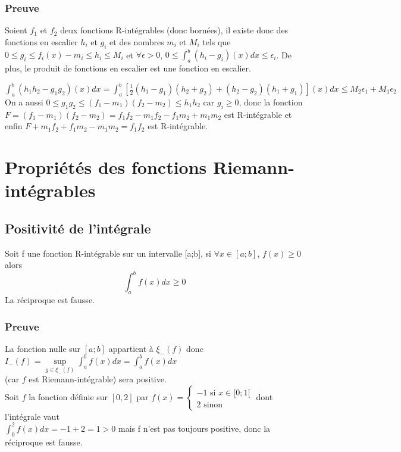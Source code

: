 \documentclass[a4paper,10pt]{book} %
\begin{document}
\subsubsection{Preuve}
Soient $f_1$ et $f_2$ deux fonctions R-intégrables (donc bornées), il existe donc des fonctions en escalier $h_i$ et $g_i$ et des nombres $m_i$ et $M_i$ tels que $0\leq g_i\leq f_i(x)-m_i\leq h_i\leq M_i$ et $\forall \epsilon>0$, $0\leq \displaystyle\int_a^b(h_i-g_i)(x)dx\leq \epsilon_i$. De plus, le produit de fonctions en escalier est une fonction en escalier.

$\displaystyle\int_a^b(h_1h_2-g_1g_2)(x)dx=\int_{a}^{b}\left[\frac{1}{2}(h_1-g_1)(h_2+g_2)+(h_2-g_2)(h_1+g_1)\right](x)dx\leq M_2\epsilon_1+M_1\epsilon_2$\\

On a aussi $0\leq g_1g_2\leq (f_1-m_1)(f_2-m_2)\leq h_1h_2$ car $g_i\geq 0$, donc la fonction\\
$F=(f_1-m_1)(f_2-m_2)=f_1f_2-m_1f_2-f_1m_2+m_1m_2$ est R-intégrable et\\
enfin $F+m_1f_2+f_1m_2-m_1m_2=f_1f_2$ est R-intégrable.\\

\newpage

\section{Propriétés des fonctions Riemann-intégrables}
\subsection{Positivité de l'intégrale}
Soit f une fonction R-intégrable sur un intervalle [a;b], si $\forall x\in [a;b]$, $f(x)\geq 0$ alors $$\int_{a}^{b}f(x)dx\geq0$$
La réciproque est fausse.

\subsubsection{Preuve}
La fonction nulle sur $[a;b]$ appartient à $\xi_-(f)$ donc $I_-(f)=\underset{g\in \xi_-(f)}{\sup}\displaystyle\int_{a}^{b}f(x)dx= \int_{a}^{b}f(x)dx$\\
(car $f$ est Riemann-intégrable) sera positive.\\

Soit $f$ la fonction définie sur $[0,2]$ par $f(x)=\left\{\begin{array}{lll}
-1\text{ si }x\in [0;1[ \\
2\text{ sinon }
\end{array} \right.$ dont l'intégrale vaut\\
$\displaystyle\int_0^2 f(x)dx=-1+2=1>0$ mais f n'est pas toujours positive, donc la réciproque est fausse.
\end{document}
